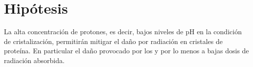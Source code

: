 \chapter{Hipótesis}

La alta concentración de protones, es decir, bajos niveles de pH en la condición de cristalización, permitirán mitigar el daño por radiación en cristales de proteína. En particular el daño provocado por los  y por lo menos a bajas dosis de radiación absorbida.
	

